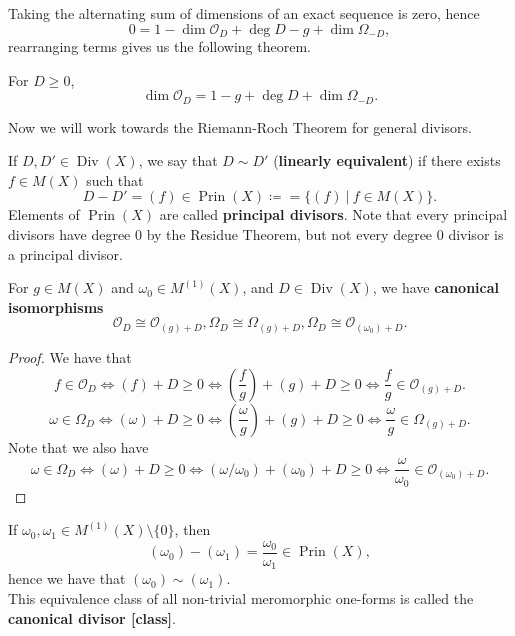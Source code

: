 \documentclass{article}
\begin{document}
{Taking the alternating sum of dimensions of an exact sequence is zero, hence
\[0 = 1 - \dim \mathcal{O}_D + \deg D - g + \dim \Omega_{-D},\]
rearranging terms gives us the following theorem.

\begin{theorem}
    For $D \geq 0$,
    \[\dim \mathcal{O}_D = 1 - g + \deg D + \dim \Omega_{-D}.\]
\end{theorem}

Now we will work towards the Riemann-Roch Theorem for general divisors.

\begin{definition}
 If $D, D' \in \operatorname{Div}(X)$,  we say that $D \sim D'$ (\textbf{linearly equivalent}) if there exists $f \in M(X)$ such that
 \[D - D' = (f) \in \operatorname{Prin}(X) \coloneqq = \{(f)\ |\ f \in M(X)\}.\]
 Elements of $\operatorname{Prin}(X)$ are called \textbf{principal divisors}. Note that every principal divisors have degree $0$ by the Residue Theorem, but not every degree $0$ divisor is a principal divisor.
\end{definition}

\begin{lemma}
For $g \in M(X)$ and $\omega_0 \in M^{(1)}(X)$, and $D \in \operatorname{Div}(X)$, we have \textbf{canonical isomorphisms}
\[\mathcal{O}_D \cong \mathcal{O}_{(g)+D}, \Omega_D \cong \Omega_{(g)+D}, \Omega_D \cong \mathcal{O}_{(\omega_0) + D}.\]
\end{lemma}

\begin{proof}
    We have that
    \[f \in \mathcal{O}_D \iff (f) + D \geq 0 \iff (\frac{f}{g}) + (g) + D \geq 0 \iff \frac{f}{g} \in \mathcal{O}_{(g) + D}.\]
    \[\omega \in \Omega_D \iff (\omega) + D \geq 0 \iff (\frac{\omega}{g}) + (g) + D \geq 0 \iff \frac{\omega}{g} \in \Omega_{(g)+D}.\]
    Note that we also have 
    \[\omega \in \Omega_D \iff (\omega) + D \geq 0 \iff (\omega/\omega_0) + (\omega_0) + D \geq 0 \iff \frac{\omega}{\omega_0} \in \mathcal{O}_{(\omega_0) + D}.\]
\end{proof}

\begin{lemma}
    If $\omega_0, \omega_1 \in M^{(1)}(X) \setminus \{0\}$, then
    \[(\omega_0) - (\omega_1) = \frac{\omega_0}{\omega_1} \in \operatorname{Prin}(X),\]
    hence we have that $(\omega_0) \sim (\omega_1)$.\\
    
    This equivalence class of all non-trivial meromorphic one-forms is called the \textbf{canonical divisor [class]}.
\end{lemma}

}
\end{document}
